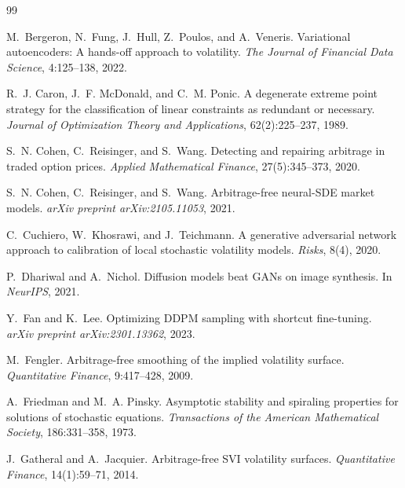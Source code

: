 \documentclass{article}
\newcommand{\1}{\mathbf{1}}
\begin{document}
\begin{thebibliography}{99}

M.~Bergeron, N.~Fung, J.~Hull, Z.~Poulos, and A.~Veneris.
\newblock Variational autoencoders: A hands-off approach to volatility.
\newblock \emph{The Journal of Financial Data Science}, 4:125--138, 2022.

R.~J. Caron, J.~F. McDonald, and C.~M. Ponic.
\newblock A degenerate extreme point strategy for the classification of linear constraints as redundant or necessary.
\newblock \emph{Journal of Optimization Theory and Applications}, 62(2):225--237, 1989.

S.~N. Cohen, C.~Reisinger, and S.~Wang.
\newblock Detecting and repairing arbitrage in traded option prices.
\newblock \emph{Applied Mathematical Finance}, 27(5):345--373, 2020.

S.~N. Cohen, C.~Reisinger, and S.~Wang.
\newblock Arbitrage-free neural-{SDE} market models.
\newblock \emph{arXiv preprint arXiv:2105.11053}, 2021.

C.~Cuchiero, W.~Khosrawi, and J.~Teichmann.
\newblock A generative adversarial network approach to calibration of local stochastic volatility models.
\newblock \emph{Risks}, 8(4), 2020.

P.~Dhariwal and A.~Nichol.
\newblock Diffusion models beat {GAN}s on image synthesis.
\newblock In \emph{NeurIPS}, 2021.

Y.~Fan and K.~Lee.
\newblock Optimizing {DDPM} sampling with shortcut fine-tuning.
\newblock \emph{arXiv preprint arXiv:2301.13362}, 2023.

M.~Fengler.
\newblock Arbitrage-free smoothing of the implied volatility surface.
\newblock \emph{Quantitative Finance}, 9:417--428, 2009.

A.~Friedman and M.~A. Pinsky.
\newblock Asymptotic stability and spiraling properties for solutions of stochastic equations.
\newblock \emph{Transactions of the American Mathematical Society}, 186:331--358, 1973.

J.~Gatheral and A.~Jacquier.
\newblock Arbitrage-free {SVI} volatility surfaces.
\newblock \emph{Quantitative Finance}, 14(1):59--71, 2014.


\end{thebibliography}
\end{document}
